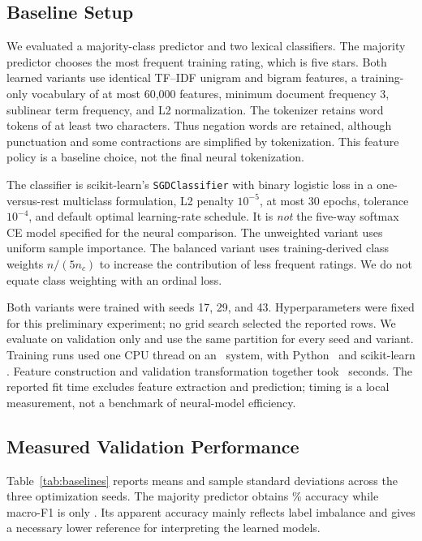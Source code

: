 \documentclass[conference]{IEEEtran}
\begin{document}
\subsection{Baseline Setup}
We evaluated a majority-class predictor and two lexical classifiers. The majority predictor chooses the most frequent training rating, which is five stars. Both learned variants use identical TF--IDF unigram and bigram features, a training-only vocabulary of at most 60,000 features, minimum document frequency 3, sublinear term frequency, and L2 normalization. The tokenizer retains word tokens of at least two characters. Thus negation words are retained, although punctuation and some contractions are simplified by tokenization. This feature policy is a baseline choice, not the final neural tokenization.

The classifier is scikit-learn's \texttt{SGDClassifier} with binary logistic loss in a one-versus-rest multiclass formulation, L2 penalty $10^{-5}$, at most 30 epochs, tolerance $10^{-4}$, and default optimal learning-rate schedule. It is \emph{not} the five-way softmax CE model specified for the neural comparison. The unweighted variant uses uniform sample importance. The balanced variant uses training-derived class weights $n/(5n_c)$ to increase the contribution of less frequent ratings. We do not equate class weighting with an ordinal loss.

Both variants were trained with seeds 17, 29, and 43. Hyperparameters were fixed for this preliminary experiment; no grid search selected the reported rows. We evaluate on validation only and use the same partition for every seed and variant. Training runs used one CPU thread on an \CPUName\ system, with Python \PythonVersion\ and scikit-learn \SklearnVersion. Feature construction and validation transformation together took \VectorSeconds\ seconds. The reported fit time excludes feature extraction and prediction; timing is a local measurement, not a benchmark of neural-model efficiency.

\subsection{Measured Validation Performance}

Table~\ref{tab:baselines} reports means and sample standard deviations across the three optimization seeds. The majority predictor obtains \MajorityAcc\% accuracy while macro-F1 is only \MajorityFone. Its apparent accuracy mainly reflects label imbalance and gives a necessary lower reference for interpreting the learned models.
\end{document}
